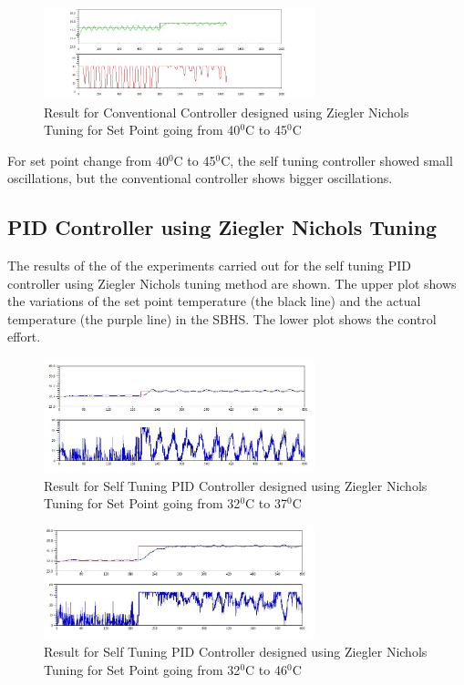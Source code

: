 \begin{figure}[h]
		\centering
\includegraphics[width=0.7\textwidth]{Vikas_self/report_tex/PID_results/Conventional_Tuning/Setpointchange/PI/step40to45.jpg}
	\caption{Result for Conventional Controller designed using Ziegler Nichols Tuning for Set Point going from 40$^0$C to 45$^0$C }
\end{figure}

For set point change from 40$^0$C to 45$^0$C, the self tuning controller showed small oscillations, but the conventional controller shows bigger oscillations.
\newpage


\subsection{PID Controller using Ziegler Nichols Tuning}\label{pidzn}
The results of the of the experiments carried out for the self tuning PID controller using Ziegler Nichols tuning method are shown. The upper plot shows the variations of the set point temperature (the black line) and the actual temperature (the purple line) in the SBHS. The lower plot shows the control effort.

\begin{figure}[h]
	\centering
\includegraphics[width=0.7\textwidth]{Vikas_self/report_tex/PID_results/self_tuning/NewSetpoint_change/PID/step32to37.jpg}
	\caption{Result for Self Tuning PID Controller designed using Ziegler Nichols Tuning for Set Point going from 32$^0$C to 37$^0$C}
\end{figure}


\begin{figure}[h]
	\centering
\includegraphics[width=0.7\textwidth]{Vikas_self/report_tex/PID_results/self_tuning/NewSetpoint_change/PID/step32to46.jpg}
	\caption{Result for Self Tuning PID Controller designed using Ziegler Nichols Tuning for Set Point going from 32$^0$C to 46$^0$C}
\end{figure}

